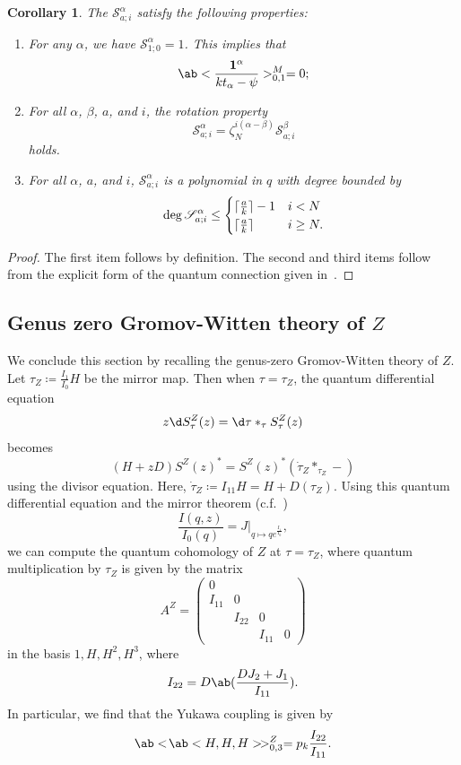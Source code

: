 \documentclass[10pt]{amsart}
\DeclarePairedDelimiter{\ceil}{\lceil}{\rceil}
\newtheorem{cor}[thm]{Corollary}
\theoremstyle{definition}
\theoremstyle{remark}
\theoremstyle{plain}
\theoremstyle{definition}
\theoremstyle{remark}
\newcommand{\msc}[1]{\mathscr{#1}}
\newcommand{\1}{\mathbf{1}}
\newcommand{\2}{\mathbf{2}}
\newcommand{\3}{\mathbf{3}}
\numberwithin{equation}{section}
\begin{document}
\begin{cor}\label{cor:restrictedsmat}
    The $\msc{S}_{a;i}^{\alpha}$ satisfy the following properties:
    \begin{enumerate}
        \item For any $\alpha$, we have $\msc{S}_{1;0}^{\alpha} = 1$. This implies that
            \[ \ab<\frac{\1^{\alpha}}{k t_{\alpha} - \psi}>_{0,1}^M = 0; \]
        \item For all $\alpha$, $\beta$, $a$, and $i$, the rotation property
            \[ \msc{S}_{a;i}^{\alpha} = \zeta_N^{i(\alpha-\beta)} \msc{S}_{a;i}^{\beta} \]
            holds.
        \item For all $\alpha$, $a$, and $i$, $\msc{S}_{a;i}^{\alpha}$ is a polynomial in $q$ with degree bounded by
            \[ \deg \msc{S}_{a;i}^{\alpha} \leq \begin{cases}
                \ceil{\frac{a}{k}}-1 & i < N \\
                \ceil{\frac{a}{k}} & i \geq N.
            \end{cases}
             \]
    \end{enumerate}
\end{cor}

\begin{proof}
    The first item follows by definition. The second and third items follow from the explicit form of the quantum connection given in~.
\end{proof}




\subsection{Genus zero Gromov-Witten theory of $Z$}%
\label{sub:Genus zero theory of X}

We conclude this section by recalling the genus-zero Gromov-Witten theory of $Z$. Let $\tau_{Z} \coloneqq \frac{I_1}{I_0} H$ be the mirror map. Then when $\tau = \tau_{Z}$, the quantum differential equation
\[ z \d S^{Z}_{\tau}(z) = \d \tau *_{\tau} S^{Z}_{\tau}(z) \]
becomes
\[ (H+zD) S^{Z}(z)^* = S^{Z}(z)^* ( \dot{\tau}_{Z} *_{\tau_{Z}} - ) \]
using the divisor equation. Here, $\dot{\tau}_{Z} \coloneqq I_{11} H = H + D(\tau_{Z})$. Using this quantum differential equation and the mirror theorem (c.f.~\cite[Corollary 28]{applmirrortoricstack})
\[ \frac{I(q,z)}{I_0(q)} = J|_{q \mapsto qe^{\frac{I_1}{I_0}}}, \]
we can compute the quantum cohomology of $Z$ at $\tau = \tau_{Z}$, where quantum multiplication by $\tau_{Z}$ is given by the matrix
\[ A^{Z} = \begin{pmatrix}
  0 & \\
  I_{11} & 0 \\
    & I_{22} & 0 \\
  & & I_{11} & 0
\end{pmatrix}\]
in the basis $1,H,H^2,H^3$, where
\[ I_{22} = D\ab(\frac{D J_2 + J_1}{I_{11}}). \]
In particular, we find that the Yukawa coupling is given by
\[\ab<\!\ab<H,H,H>\!>_{0,3}^{Z} = p_k \frac{I_{22}}{I_{11}}. \]
\end{document}
